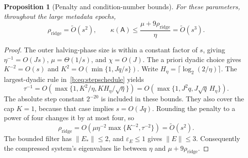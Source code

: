 \documentclass[11pt]{amsart}
\newtheorem{proposition}[theorem]{Proposition}
\theoremstyle{definition}\newtheorem{definition}[theorem]{Definition}
\theoremstyle{remark}\newtheorem{remark}[theorem]{Remark}
\numberwithin{equation}{section}
\begin{document}
\begin{proposition}[Penalty and condition-number bounds]\label{r:conditioning}
For these parameters, throughout the large metadata epochs,
\[
 \rho_{\mathrm{ridge}}=\widetilde O(s^2),\qquad
 \kappa(\mathsf{A})\le
       \frac{\mu+9\rho_{\mathrm{ridge}}}{\eta}
       =\widetilde O(s^3).
\]
\end{proposition}
\begin{proof}
The outer halving-phase size is within a constant factor of $s$, giving
$\eta^{-1}=O(Js)$, $\mu=\Theta(1/s)$, and $\chi=O(J)$.
The a priori dyadic choice gives $K^{-2}=O(s)$ and
$K^2=O(\min\{1,Jq/s\})$. Write
$H_\eta=\lceil\log_2(2/\eta)\rceil$.
The largest-dyadic rule in~\eqref{b:eq:stepschedule} yields
\[
 \tau^{-1}
 =O\!\left(\max\{1,K^2/\eta,KH_\eta/\sqrt\eta\}\right)
 =O\!\left(\max\{1,J^2q,J\sqrt q\,H_\eta\}\right).
\]
The absolute step constant $2^{-20}$ is included in these bounds.
They also cover the cap $K=1$, because that case implies $s=O(Jq)$.
Rounding the penalty to a power of four changes it by at most four, so
\[
 \rho_{\mathrm{ridge}}
 =O\!\left(\mu\eta^{-2}\max\{K^{-2},\tau^{-2}\}\right)
 =\widetilde O(s^2).
\]
The bounded filter has $\|E_*\|\le2$, and $\varepsilon_E\le1$ gives
$\|E\|\le3$. Consequently the compressed system's eigenvalues lie
between $\eta$ and $\mu+9\rho_{\mathrm{ridge}}$.
\end{proof}
\end{document}
